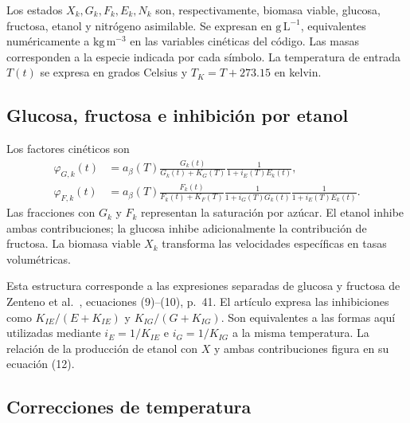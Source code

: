 \documentclass[11pt,a4paper]{article}
\begin{document}
Los estados $X_k,G_k,F_k,E_k,N_k$ son, respectivamente, biomasa viable,
glucosa, fructosa, etanol y nitrógeno asimilable. Se expresan en
$\mathrm{g\,L^{-1}}$, equivalentes numéricamente a
$\mathrm{kg\,m^{-3}}$ en las variables cinéticas del código. Las masas
corresponden a la especie indicada por cada símbolo. La temperatura de entrada
$T(t)$ se expresa en grados Celsius y $T_K=T+273.15$ en kelvin.

\subsection{Glucosa, fructosa e inhibición por etanol}

Los factores cinéticos son
\begin{align}
\varphi_{G,k}(t)&=a_\beta(T)
\frac{G_k(t)}{G_k(t)+K_G(T)}
\frac{1}{1+i_E(T)E_k(t)},\label{eq:phiG}\\
\varphi_{F,k}(t)&=a_\beta(T)
\frac{F_k(t)}{F_k(t)+K_F(T)}
\frac{1}{1+i_G(T)G_k(t)}
\frac{1}{1+i_E(T)E_k(t)}.\label{eq:phiF}
\end{align}
Las fracciones con $G_k$ y $F_k$ representan la saturación por azúcar. El etanol
inhibe ambas contribuciones; la glucosa inhibe adicionalmente la contribución
de fructosa. La biomasa viable $X_k$ transforma las velocidades específicas en
tasas volumétricas.

Esta estructura corresponde a las expresiones separadas de glucosa y
fructosa de Zenteno et al.~\cite{zenteno2010}, ecuaciones (9)--(10), p.~41.
El artículo expresa las inhibiciones como $K_{IE}/(E+K_{IE})$ y
$K_{IG}/(G+K_{IG})$. Son equivalentes a las formas aquí utilizadas mediante
$i_E=1/K_{IE}$ e $i_G=1/K_{IG}$ a la misma temperatura. La relación de la
producción de etanol con $X$ y ambas contribuciones figura en su ecuación (12).

\subsection{Correcciones de temperatura}
\end{document}
